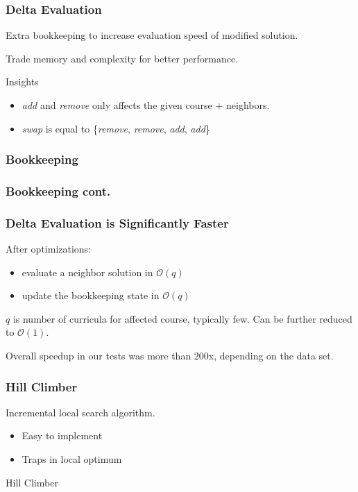 \documentclass{beamer}
\makeatletter
\newenvironment{algorithm}[1][]{%
  \def\@captype{algorithm}%
  \par\nobreak\begin{center}\nobreak}
  {\par\nobreak\end{center}\nobreak}
\newcounter{algorithm}
\makeatother
\begin{document}
\begin{frame}
	\frametitle{Delta Evaluation}
	Extra bookkeeping to increase evaluation speed of modified solution.
	
	Trade memory and complexity for better performance.
	
	\begin{block}{Insights}
		\begin{itemize}
			\item \emph{add} and \emph{remove} only affects the given course $+$ neighbors.
			\item \emph{swap} is equal to \{\emph{remove}, \emph{remove}, \emph{add}, \emph{add}\}
		\end{itemize}	
	\end{block}
	
\end{frame}

\begin{frame}
	\frametitle{Bookkeeping}
	\lstI
\end{frame}

\begin{frame}
	\frametitle{Bookkeeping cont.}
	\lstII
\end{frame}

\begin{frame}
	\frametitle{Delta Evaluation is Significantly Faster}
	After optimizations:
	
	\begin{itemize}
		\item evaluate a neighbor solution in $\mathcal{O}(q)$
		\item update the bookkeeping state in $\mathcal{O}(q)$
	\end{itemize}
	
	$q$ is number of curricula for affected course, typically few. Can be further reduced to $\mathcal{O}(1)$.
	
	Overall speedup in our tests was more than 200x, depending on the data set.
\end{frame}


\begin{frame}
\frametitle{Hill Climber}
Incremental local search algorithm. 
\begin{itemize}
\item Easy to implement
\item Traps in local optimum
\end{itemize}
\begin{algorithm}[H]
\begin{algorithmic}[1]
\REPEAT
{}
\ENDIF
{}
\end{algorithmic}
\caption{Hill Climber }
\label{alg:seq}
\end{algorithm}
\end{frame}
\end{document}
